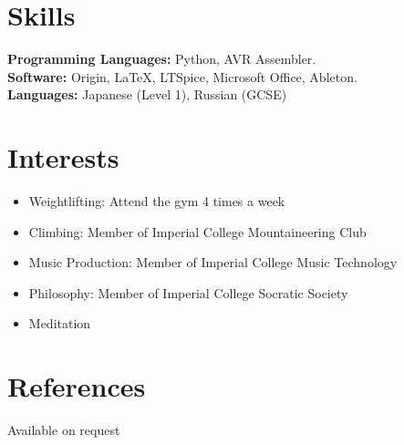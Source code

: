 \documentclass[margin]{res}
\begin{document}
\begin{resume}
\begin{itemize}
 \end{itemize}

\singlespacing
\section{Skills}
   {\bf Programming Languages:} 
 Python, AVR Assembler.\\
     {\bf Software:} 
 Origin, \LaTeX, LTSpice, Microsoft Office, Ableton.\\
{\bf Languages:}
 Japanese (Level 1), Russian (GCSE)
\singlespacing

\section{Interests}
\begin{itemize}\itemsep -2pt
\item Weightlifting: Attend the gym 4 times a week
\item Climbing: Member of Imperial College Mountaineering Club
\item Music Production: Member of Imperial College Music Technology
\item Philosophy: Member of Imperial College Socratic Society
\item Meditation
\end{itemize}
\section{References}
Available on request

\end{resume} 
\end{document}
